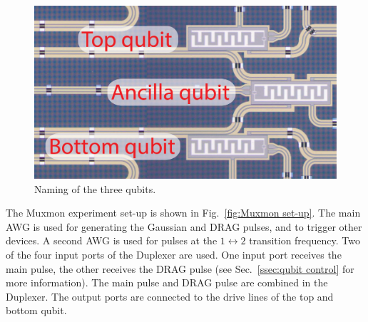       \begin{figure}
        \begin{center}
        \vspace{-30pt}
          \includegraphics[width=\textwidth]{Figures/Qubit names.jpg}
        \end{center}
        \vspace{-20 pt}
        \caption{Naming of the three qubits.}
        \label{fig:Qubit names}
      \end{figure}


      The Muxmon experiment set-up is shown in Fig.~\ref{fig:Muxmon set-up}. The main AWG is used for generating the Gaussian and DRAG pulses, and to trigger other devices. A second AWG is used for pulses at the $1 \leftrightarrow 2$ transition frequency. Two of the four input ports of the Duplexer are used. One input port receives the main pulse, the other receives the DRAG pulse (see Sec.~\ref{ssec:qubit control} for more information). The main pulse and DRAG pulse are combined in the Duplexer. The output ports are connected to the drive lines of the top and bottom qubit.


